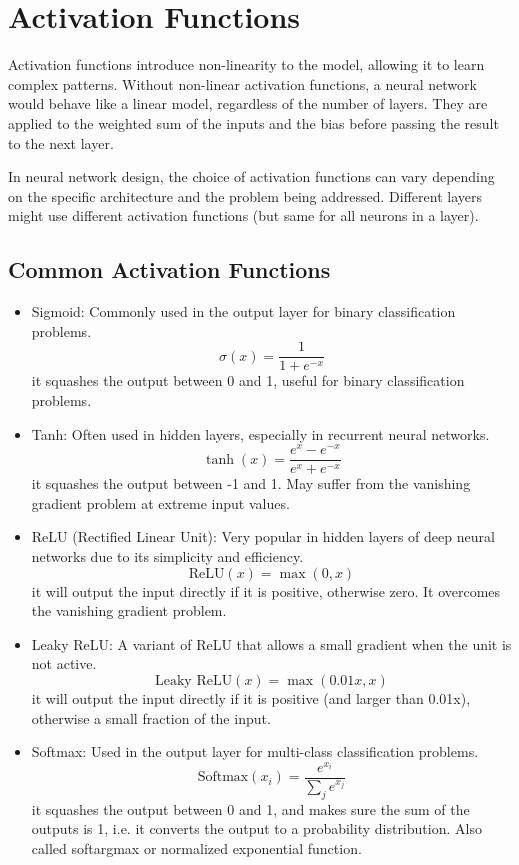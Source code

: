\documentclass{article}
\begin{document}
\section{Activation Functions}
Activation functions introduce non-linearity to the model, allowing it to learn complex patterns. Without non-linear activation functions, a neural network would behave like a linear model, regardless of the number of layers.
They are applied to the weighted sum of the inputs and the bias before passing the result to the next layer. 

In neural network design, the choice of activation functions can vary depending on the specific architecture and the problem being addressed. Different layers might use different activation functions (but same for all neurons in a layer). 

\subsection{Common Activation Functions}

\begin{itemize}
    \item Sigmoid: Commonly used in the output layer for binary classification problems.
    \[\sigma(x) = \frac{1}{1 + e^{-x}} \]
    it squashes the output between 0 and 1, useful for binary classification problems. 
    \item Tanh: Often used in hidden layers, especially in recurrent neural networks. 
    \[ \tanh(x) = \frac{e^x - e^{-x}}{e^x + e^{-x}} \]
    it squashes the output between -1 and 1. May suffer from the vanishing gradient problem at extreme input values.
    \item ReLU (Rectified Linear Unit): Very popular in hidden layers of deep neural networks due to its simplicity and efficiency.
    \[ \text{ReLU}(x) = \max(0, x) \]
    it will output the input directly if it is positive, otherwise zero. It overcomes the vanishing gradient problem. 
    \item Leaky ReLU: A variant of ReLU that allows a small gradient when the unit is not active.
    \[ \text{Leaky ReLU}(x) = \max(0.01x, x) \]
    it will output the input directly if it is positive (and larger than 0.01x), otherwise a small fraction of the input. 
    \item Softmax: Used in the output layer for multi-class classification problems. 
    \[ \text{Softmax}(x_i) = \frac{e^{x_i}}{\sum_{j}e^{x_j}} \]
    it squashes the output between 0 and 1, and makes sure the sum of the outputs is 1, i.e. it converts the output to a probability distribution. 
    Also called softargmax or normalized exponential function.
\end{itemize}
\end{document}
